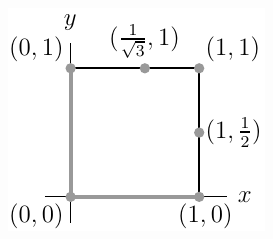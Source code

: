 \begin{eg}
\begin{efig}
\begin{center}
   \includegraphics{optExampleC}
\end{center}
\end{efig}
\end{eg}
\goodbreak

